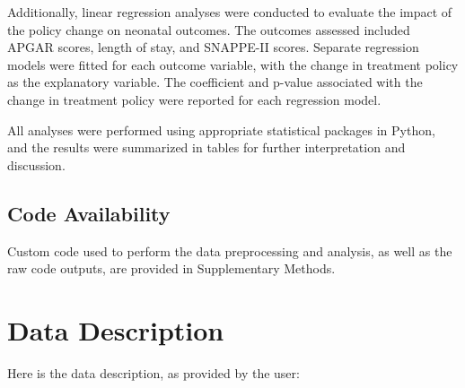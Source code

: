 \documentclass[11pt]{article}
\begin{document}
Additionally, linear regression analyses were conducted to evaluate the impact of the policy change on neonatal outcomes. The outcomes assessed included APGAR scores, length of stay, and SNAPPE-II scores. Separate regression models were fitted for each outcome variable, with the change in treatment policy as the explanatory variable. The coefficient and p-value associated with the change in treatment policy were reported for each regression model.

All analyses were performed using appropriate statistical packages in Python, and the results were summarized in tables for further interpretation and discussion.\subsection*{Code Availability}

Custom code used to perform the data preprocessing and analysis, as well as the raw code outputs, are provided in Supplementary Methods.


\clearpage
\appendix

\section{Data Description} \label{sec:data_description} Here is the data description, as provided by the user:
\end{document}
